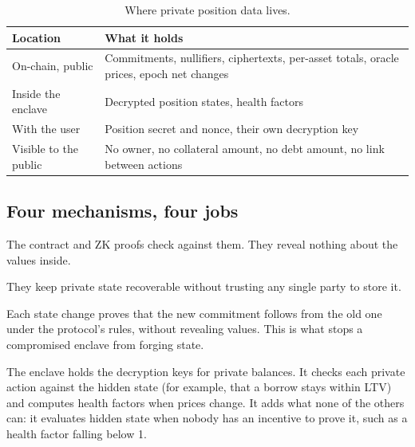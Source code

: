 \documentclass[11pt,a4paper]{article}
\begin{document}
\begin{table}[h]
\centering
\caption{Where private position data lives.}
\label{tab:where}
\begin{tabularx}{\textwidth}{@{}p{3.6cm}L@{}}
\toprule
Location & What it holds \\
\midrule
On-chain, public & Commitments, nullifiers, ciphertexts, per-asset totals, oracle prices, epoch net changes \\
Inside the enclave & Decrypted position states, health factors \\
With the user & Position secret and nonce, their own decryption key \\
Visible to the public & No owner, no collateral amount, no debt amount, no link between actions \\
\bottomrule
\end{tabularx}
\end{table}

\subsection{Four mechanisms, four jobs}
\label{sec:mechanisms}

\begin{description}[leftmargin=0pt, labelsep=0.5em]
  \item[Commitments give integrity.] The contract and ZK proofs check against them. They reveal nothing about the
        values inside.
  \item[Ciphertexts give availability.] They keep private state recoverable without trusting any single party to
        store it.
  \item[ZK proofs give correctness.] Each state change proves that the new commitment follows from the old one
        under the protocol's rules, without revealing values. This is what stops a compromised enclave from
        forging state.
  \item[The TEE gives hidden checks.] The enclave holds the decryption keys for private balances. It checks each
        private action against the hidden state (for example, that a borrow stays within LTV) and computes
        health factors when prices change. It adds what none of the others can: it evaluates hidden state when
        nobody has an incentive to prove it, such as a health factor falling below 1.
\end{description}
\end{document}
